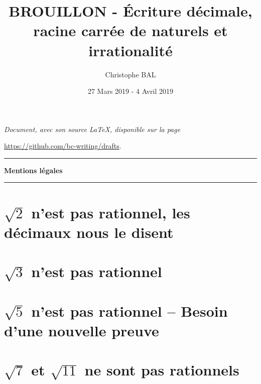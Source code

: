 \documentclass[12pt]{amsart}
\begin{document}
\title{BROUILLON - Écriture décimale, racine carrée de naturels et irrationalité}
\author{Christophe BAL}
\date{27 Mars 2019 - 4 Avril 2019}

\maketitle

\begin{center}
	\itshape
	Document, avec son source \LaTeX, disponible sur la page
	
	\url{https://github.com/bc-writing/drafts}.
\end{center}


\bigskip


\begin{center}
	\hrule\vspace{.3em}
	{
		\fontsize{1.35em}{1em}\selectfont
		\textbf{Mentions \og légales \fg}
	}
			
	\vspace{0.45em}
	\doclicenseThis
	\hrule
\end{center}


\setcounter{tocdepth}{2}
\tableofcontents



\section{$\sqrt2$ n'est pas rationnel, les décimaux nous le disent}





\section{$\sqrt3$ n'est pas rationnel}




\section{$\sqrt5$ n'est pas rationnel -- Besoin d'une nouvelle preuve}





\section{$\sqrt7$ et $\sqrt{11}$ ne sont pas rationnels}
\end{document}
